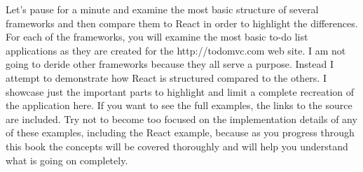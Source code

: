 Let’s pause for a minute and examine the most basic structure of several frameworks and then compare them to React in order to highlight the differences. For each of the frameworks, you will examine the most basic to-do list applications as they are created for the http://todomvc.com web site. I am not going to deride other frameworks because they all serve a purpose. Instead I attempt to demonstrate how React is structured compared to the others. I showcase just the important parts to highlight and limit a complete recreation of the application here. If you want to see the full examples, the links to the source are included. Try not to become too focused on the implementation details of any of these examples, including the React example, because as you progress through this book the concepts will be covered thoroughly and will help you understand what is going on completely.